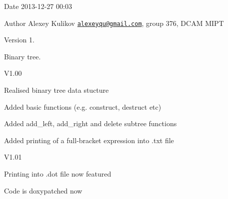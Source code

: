 \begin{DoxyDate}{Date}
2013-\/12-\/27 00\-:03 
\end{DoxyDate}
\begin{DoxyAuthor}{Author}
Alexey Kulikov \href{mailto:alexeyqu@gmail.com}{\tt alexeyqu@gmail.\-com}, group 376, D\-C\-A\-M M\-I\-P\-T 
\end{DoxyAuthor}
\begin{DoxyVersion}{Version}
1.
\end{DoxyVersion}
Binary tree.

\begin{DoxyParagraph}{V1.00}

\begin{DoxyItemize}
\item Realised binary tree data stucture
\item Added basic functions (e.\-g. construct, destruct etc)
\item Added add\-\_\-left, add\-\_\-right and delete subtree functions
\item Added printing of a full-\/bracket expression into .txt file
\end{DoxyItemize}
\end{DoxyParagraph}
\begin{DoxyParagraph}{V1.01}

\begin{DoxyItemize}
\item Printing into .dot file now featured
\item Code is doxypatched now 
\end{DoxyItemize}
\end{DoxyParagraph}
